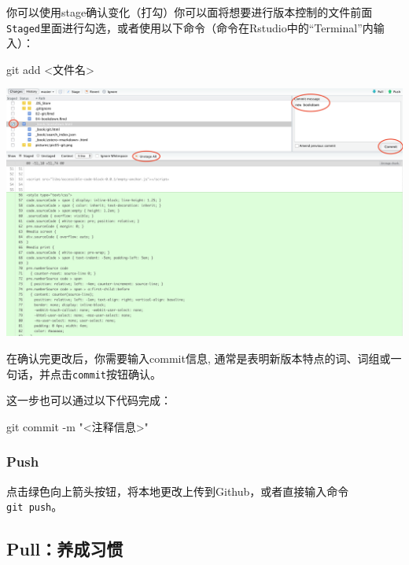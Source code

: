 \documentclass[
  letterpaper,
  DIV=11,
  numbers=noendperiod,
  oneside]{scrreprt}
\newenvironment{Shaded}{}{}
\newcommand{\NormalTok}[1]{\textcolor[rgb]{0.14,0.16,0.18}{#1}}
\begin{document}
你可以使用stage确认变化（打勾）你可以面将想要进行版本控制的文件前面\texttt{Staged}里面进行勾选，或者使用以下命令（命令在Rstudio中的``Terminal''内输入）：

\begin{Shaded}
\begin{Highlighting}[]
\NormalTok{git add \textless{}文件名\textgreater{}}
\end{Highlighting}
\end{Shaded}

\includegraphics{./images/git_commit.png}

在确认完更改后，你需要输入commit信息,
通常是表明新版本特点的词、词组或一句话，并点击\texttt{commit}按钮确认。

这一步也可以通过以下代码完成：

\begin{Shaded}
\begin{Highlighting}[]
\NormalTok{git commit {-}m "\textless{}注释信息\textgreater{}"}
\end{Highlighting}
\end{Shaded}

\hypertarget{push}{%
\subsubsection{Push}\label{push}}

点击绿色向上箭头按钮，将本地更改上传到Github，或者直接输入命令\texttt{git\ push}。

\hypertarget{pullux517bux6210ux4e60ux60ef}{%
\subsection{Pull：养成习惯}\label{pullux517bux6210ux4e60ux60ef}}
\end{document}
